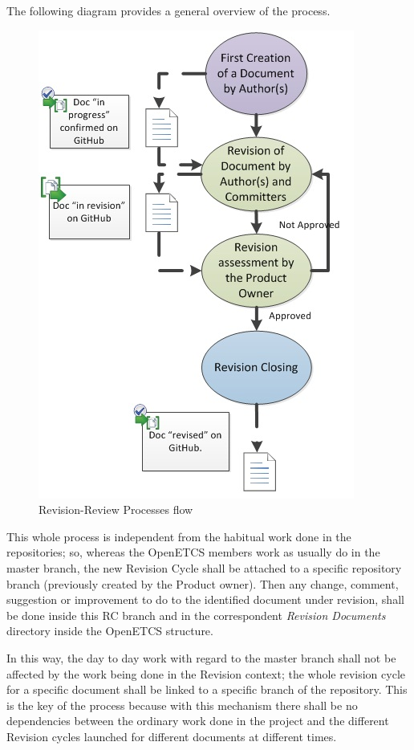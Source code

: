 \documentclass{template/openetcs_article}
\begin{document}
The following diagram provides a general overview of the process. 

\begin{figure}[H]
\centering
\includegraphics{./figures/RevisionProcess.JPG}
\caption{Revision-Review Processes flow}
\end{figure}


This whole process is independent from the habitual work done in the repositories; so, whereas the OpenETCS members work as usually do in the master branch, the new Revision Cycle shall be attached to a specific repository branch (previously created by the Product owner). Then any change, comment, suggestion or improvement to do to the identified document under revision, shall be done inside this RC branch and in the correspondent {\it Revision Documents} directory inside the OpenETCS structure. 

In this way, the day to day work with regard to the master branch shall not be affected by the work being done in the Revision context; the whole revision cycle for a specific document shall be linked to a specific branch of the repository. 
This is the key of the process because with this mechanism there shall be no dependencies between the ordinary work done in the project and the different Revision cycles launched for different documents at different times.
\end{document}
